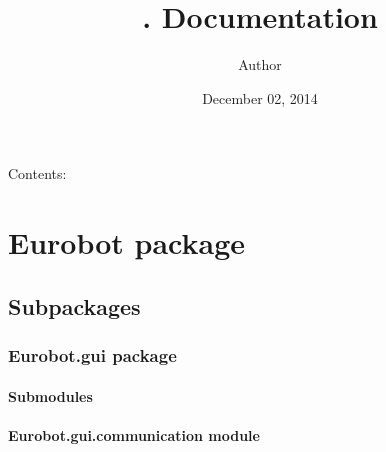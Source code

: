 \documentclass[letterpaper,10pt,english]{sphinxmanual}
\title{. Documentation}
\date{December 02, 2014}
\author{Author}
\begin{document}
\maketitle
\tableofcontents
{}\label{index::doc}


Contents:


\chapter{Eurobot package}
\label{Eurobot::doc}\label{Eurobot:eurobot-package}\label{Eurobot:welcome-to-s-documentation}

\section{Subpackages}
\label{Eurobot:subpackages}

\subsection{Eurobot.gui package}
\label{Eurobot.gui:eurobot-gui-package}\label{Eurobot.gui::doc}

\subsubsection{Submodules}
\label{Eurobot.gui:submodules}

\subsubsection{Eurobot.gui.communication module}
\label{Eurobot.gui:module-Eurobot.gui.communication}\label{Eurobot.gui:eurobot-gui-communication-module}
\end{document}
